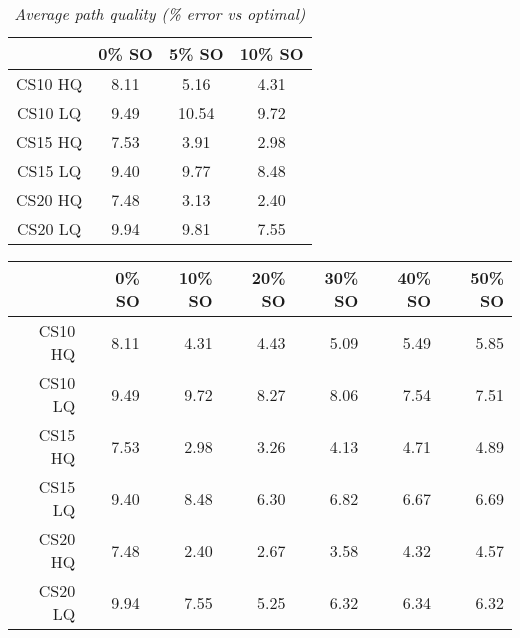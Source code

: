 \begin{table}[ht]
\begin{center}
\caption{\small{\emph{Average path quality (\% error vs optimal)}}}
\label{aha-table:pathquality}
\begin{tabular*}{0.4\textwidth}{@{\extracolsep{\fill}}cccc}%
  \hline
 & \small{0\% SO} & \small{5\% SO} & \small{10\% SO} \\
  \hline
 \small{CS10 HQ} & \small{8.11} & \small{5.16}  & \small{4.31} \\
 \small{CS10 LQ} & \small{9.49} & \small{10.54} & \small{9.72} \\
 \small{CS15 HQ} & \small{7.53} & \small{3.91}  & \small{2.98} \\
 \small{CS15 LQ} & \small{9.40} & \small{9.77}  & \small{8.48} \\
 \small{CS20 HQ} & \small{7.48} & \small{3.13}  & \small{2.40} \\
 \small{CS20 LQ} & \small{9.94} & \small{9.81}  & \small{7.55} \\
   \hline
\end{tabular*}
\end{center}
\end{table}

\begin{table}[ht]
\begin{center}
\begin{tabular}{rrrrrrr}
  \hline
 & 0\% SO & 10\% SO & 20\% SO & 30\% SO & 40\% SO & 50\% SO \\
  \hline
CS10 HQ & 8.11 & 4.31 & 4.43 & 5.09 & 5.49 & 5.85 \\
  CS10 LQ & 9.49 & 9.72 & 8.27 & 8.06 & 7.54 & 7.51 \\
  CS15 HQ & 7.53 & 2.98 & 3.26 & 4.13 & 4.71 & 4.89 \\
  CS15 LQ & 9.40 & 8.48 & 6.30 & 6.82 & 6.67 & 6.69 \\
  CS20 HQ & 7.48 & 2.40 & 2.67 & 3.58 & 4.32 & 4.57 \\
  CS20 LQ & 9.94 & 7.55 & 5.25 & 6.32 & 6.34 & 6.32 \\
   \hline
\end{tabular}
\end{center}
\end{table}

